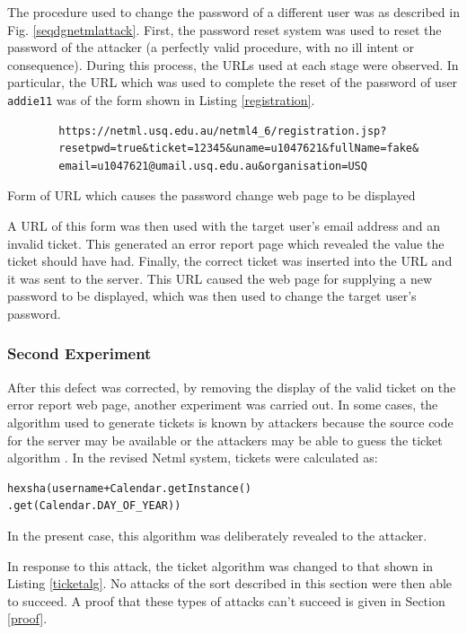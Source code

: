 The procedure used to change the password of a different user was as
described in Fig. \ref{seqdgnetmlattack}. First, the password reset system was used to reset the password
of the attacker (a perfectly valid procedure, with no ill intent or 
consequence). During this process, the URLs used at each stage
were observed. In particular, the URL which was used to complete
the reset of the password of user \verb|addie11| was of the form
shown in Listing \ref{registration}.
\begin{listing}{\scriptsize
		\begin{verbatim}
		https://netml.usq.edu.au/netml4_6/registration.jsp?
		resetpwd=true&ticket=12345&uname=u1047621&fullName=fake&
		email=u1047621@umail.usq.edu.au&organisation=USQ
		\end{verbatim}
	}
	\caption{Form of URL which causes the password change web page to be displayed}
	\label{registration}
\end{listing}
A URL of this form was then used with the target user's email address and 
an invalid ticket. This generated an error report page which revealed
the value the ticket should have had. Finally, the correct ticket was
inserted into the URL and it was sent to the server. This URL caused
the web page for supplying a new password to be displayed, which was then
used to change the target user's password.
\subsubsection{Second Experiment}
After this defect was corrected, by removing the display of the valid ticket on the error report web page,  another experiment was carried out. In some cases, the algorithm used to generate tickets is known by attackers because the source code for the server may be available or the attackers may be able to guess the ticket algorithm \cite{wang2018end}. In the revised Netml system, tickets were calculated as:
\begin{verbatim}
hexsha(username+Calendar.getInstance()
.get(Calendar.DAY_OF_YEAR))
\end{verbatim}
In the present case, this algorithm was deliberately revealed to the attacker.

In response to this attack, the ticket algorithm was changed to that shown in Listing \ref{ticketalg}. No attacks of the sort
described in this section were then able to succeed. A proof that these types of attacks can't succeed is given in Section \ref{proof}. 
\fi

